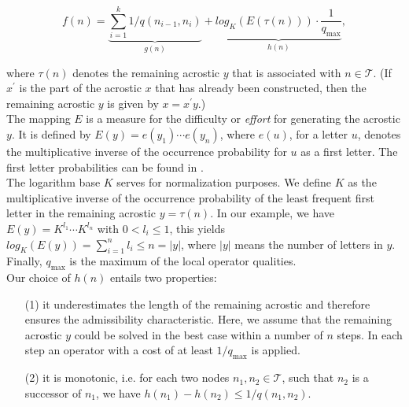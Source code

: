 \documentclass[11pt]{reportAlternative}
\begin{document}
\begin{displaymath}
f(n)= \underbrace{\sum_{i=1}^k 1/q(n_{i-1},n_i)}_{g(n)} + 
\underbrace{log_K(E(\tau(n)))\cdot \frac{1}{q_{\mathrm{max}}}}_{h(n)},
\end{displaymath} 

where $\tau(n)$ denotes the remaining acrostic $y$ that is associated with $n\in\mathcal{T}$. (If $x^{\prime}$ is the part of the acrostic $x$ that has already been constructed, then the remaining acrostic $y$ is given by $x=x^{\prime}y$.)\\
The mapping $E$ is a measure for the difficulty or \emph{effort} for generating the acrostic $y$. It is defined by $E(y) = e(y_1)\cdots e(y_n)$, where $e(u)$, for a letter $u$, denotes the multiplicative inverse of the occurrence probability for $u$ as a first letter. The first letter probabilities can be found in \cite{FirstLetterFrequencies}.\\
The logarithm base $K$ serves for normalization purposes. We define $K$ as the multiplicative inverse of the occurrence probability of the least frequent first letter in the remaining acrostic $y=\tau(n)$. In our example, we have $E(y)=K^{l_1}\cdots K^{l_n}$ with $0<l_i\leq 1$, this yields $log_K(E(y))=\sum_{i=1}^n l_i \leq n =|y|$, where $|y|$ means the number of letters in $y$.\\
Finally, $q_{\mathrm{max}}$ is the maximum of the local operator qualities. \\


Our choice of $h(n)$ entails two properties:

\begin{enumerate}

\item[(1)] it underestimates the length of the remaining acrostic and therefore ensures the admissibility characteristic. Here, we assume that the remaining acrostic $y$ could be solved in the best case within a number of $n$ steps. In each step an operator with a cost of at least $1/q_{\mathrm{max}}$ is applied.


\item[(2)] it is monotonic, i.e. for each two nodes $n_1,n_2\in\mathcal{T}$, such that $n_2$ is a successor of $n_1$, we have $h(n_1)-h(n_2)\le 1/q(n_1,n_2)$.


\end{enumerate}
\end{document}

